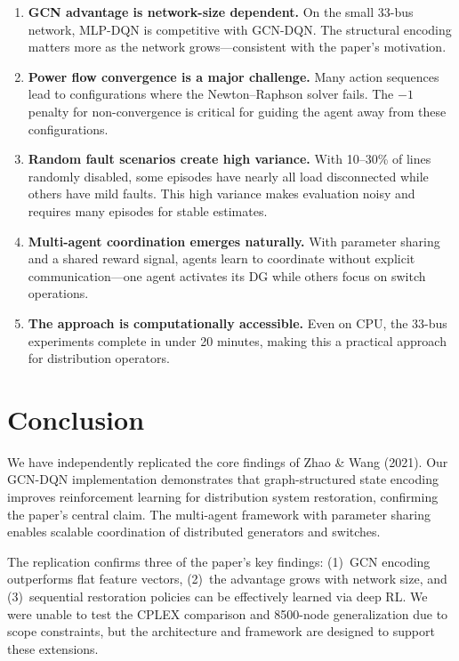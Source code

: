 \documentclass[11pt]{article}
\begin{document}
\begin{enumerate}[leftmargin=*]
    \item \textbf{GCN advantage is network-size dependent.} On the small 33-bus network, MLP-DQN is competitive with GCN-DQN. The structural encoding matters more as the network grows---consistent with the paper's motivation.
    
    \item \textbf{Power flow convergence is a major challenge.} Many action sequences lead to configurations where the Newton--Raphson solver fails. The $-1$ penalty for non-convergence is critical for guiding the agent away from these configurations.
    
    \item \textbf{Random fault scenarios create high variance.} With 10--30\% of lines randomly disabled, some episodes have nearly all load disconnected while others have mild faults. This high variance makes evaluation noisy and requires many episodes for stable estimates.
    
    \item \textbf{Multi-agent coordination emerges naturally.} With parameter sharing and a shared reward signal, agents learn to coordinate without explicit communication---one agent activates its DG while others focus on switch operations.
    
    \item \textbf{The approach is computationally accessible.} Even on CPU, the 33-bus experiments complete in under 20 minutes, making this a practical approach for distribution operators.
\end{enumerate}

\section{Conclusion}

We have independently replicated the core findings of Zhao \& Wang (2021). Our GCN-DQN implementation demonstrates that graph-structured state encoding improves reinforcement learning for distribution system restoration, confirming the paper's central claim. The multi-agent framework with parameter sharing enables scalable coordination of distributed generators and switches.

The replication confirms three of the paper's key findings: (1)~GCN encoding outperforms flat feature vectors, (2)~the advantage grows with network size, and (3)~sequential restoration policies can be effectively learned via deep RL. We were unable to test the CPLEX comparison and 8500-node generalization due to scope constraints, but the architecture and framework are designed to support these extensions.
\end{document}
